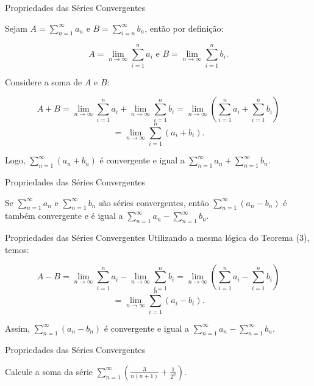 \documentclass[brazil]{beamer}
\begin{document}
	\begin{frame}{Propriedades das Séries Convergentes}
		
		Sejam $A = \displaystyle\sum_{n=1}^{\infty} a_n$ e $B =
		\displaystyle\sum_{i=n}^{\infty} b_n$, então por definição:
		
		$$A = \lim_{n \to \infty} \sum_{i=1}^{n} a_i \text{ e } B = \lim_{n \to \infty} \sum_{i=1}^{n} b_i.$$
		
		Considere a soma de $A$ e $B$:
		
		$$A + B = \lim_{n \to \infty} \sum_{i=1}^{n} a_i + \lim_{n \to \infty} \sum_{i=1}^{n} b_i = \lim_{n \to \infty} \left( \sum_{i=1}^{n} a_i + \sum_{i=1}^{n} b_i \right)$$$$ = \lim_{n \to \infty} \sum_{i=1}^{n} (a_i + b_i).$$
		
		Logo, $\displaystyle\sum_{n=1}^{\infty} (a_n + b_n)$ é convergente e igual a
		$\displaystyle\sum_{n=1}^{\infty} a_n + \displaystyle\sum_{n=1}^{\infty} b_n$.
		
	\end{frame}
	
	\begin{frame}{Propriedades das Séries Convergentes}
		\begin{theorem}[4]
			
			Se $\displaystyle\sum_{n=1}^{\infty} a_n$ e $\displaystyle\sum_{n=1}^{\infty}
			b_n$ são séries convergentes, então $\displaystyle\sum_{n=1}^{\infty} (a_n -
			b_n)$ é também convergente e é igual a $\displaystyle\sum_{n=1}^{\infty} a_n -
			\displaystyle\sum_{n=1}^{\infty} b_n$.
			
		\end{theorem}
	\end{frame}
	\begin{frame}{Propriedades das Séries Convergentes}
		Utilizando a mesma lógica do Teorema (3), temos:
		
		$$A - B = \lim_{n \to \infty} \sum_{i=1}^{n} a_i - \lim_{n \to \infty} \sum_{i=1}^{n} b_i = \lim_{n \to \infty} \left( \sum_{i=1}^{n} a_i - \sum_{i=1}^{n} b_i \right) $$$$= \lim_{n \to \infty} \sum_{i=1}^{n} (a_i - b_i).$$
		
		Assim, $\displaystyle\sum_{n=1}^{\infty} (a_n - b_n)$ é convergente e igual a
		$\displaystyle\sum_{n=1}^{\infty} a_n - \displaystyle\sum_{n=1}^{\infty} b_n$.
	\end{frame}
	\begin{frame}{Propriedades das Séries Convergentes}
		
		\begin{example}[1]
			Calcule a soma da série $\displaystyle\sum_{n=1}^{\infty} \left(\frac{3}{n(n + 1)} + \frac{1}{2^n}\right)$.
		\end{example}
		
	\end{frame}
	
\end{document}
